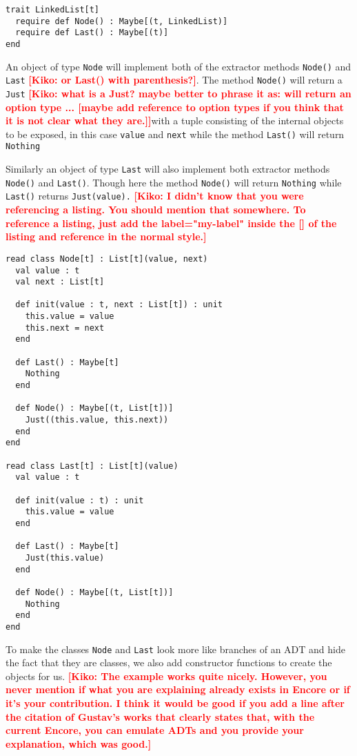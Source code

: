 \documentclass[10pt]{report}
\newcommand{\KIKO}[1]{\textcolor{red}{\textbf{[Kiko: #1]}}}
\begin{document}
\begin{lstlisting}[language=encore,caption={trait LinkedList that requires classes to implement destructor methods}]
trait LinkedList[t]
  require def Node() : Maybe[(t, LinkedList)]
  require def Last() : Maybe[(t)]
end
\end{lstlisting}
\par{\noindent An object of type \texttt{Node} will implement both of the extractor methods \texttt{Node()} and \texttt{Last} \KIKO{or Last() with parenthesis?}. The method \texttt{Node()} will return a \texttt{Just} \KIKO{what is a Just? maybe better to phrase it as: will return an option type ... [maybe add reference to option types if you think that it is not clear what they are.]}with a tuple consisting of the internal objects to be exposed, in this case \texttt{value} and \texttt{next} while the method \texttt{Last()} will return \texttt{Nothing}}

\par{\noindent Similarly an object of type \texttt{Last} will also implement both extractor methods \texttt{Node()} and \texttt{Last()}. Though here the method \texttt{Node()} will return \texttt{Nothing} while \texttt{Last()} returns \texttt{Just(value).}}
\KIKO{I didn't know that you were referencing a listing. You should mention that somewhere.
  To reference a listing, just add the label="my-label" inside the [] of the listing and reference
  in the normal style.}



\begin{lstlisting}[language=encore,caption={Implementation of Node and Last classes}]
read class Node[t] : List[t](value, next)
  val value : t
  val next : List[t]

  def init(value : t, next : List[t]) : unit
    this.value = value
    this.next = next
  end

  def Last() : Maybe[t]
    Nothing
  end

  def Node() : Maybe[(t, List[t])]
    Just((this.value, this.next))
  end
end

read class Last[t] : List[t](value)
  val value : t

  def init(value : t) : unit
    this.value = value
  end

  def Last() : Maybe[t]
    Just(this.value)
  end

  def Node() : Maybe[(t, List[t])]
    Nothing
  end
end
\end{lstlisting}

\par{\noindent To make the classes \texttt{Node} and \texttt{Last} look more like branches of an ADT and hide the fact that they are classes, we also add constructor functions to create the objects for us.}
\KIKO{The example works quite nicely. However, you never mention if what you are explaining already exists in Encore or if it's your contribution. I think it would be good if you add a line after the citation of Gustav's works that clearly states that, with the current Encore, you can emulate ADTs and you provide your explanation, which was good.}
\end{document}
